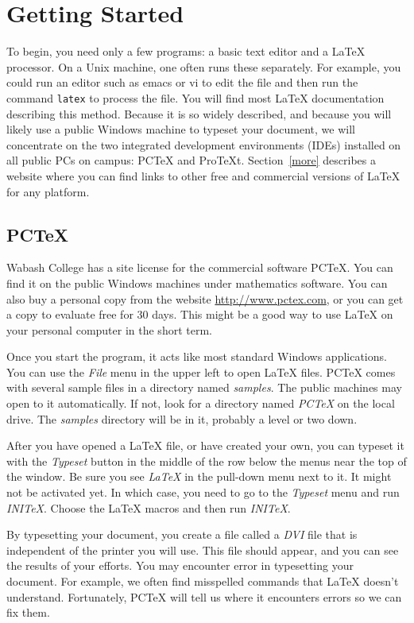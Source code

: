 \documentclass[titlepage]{article}                %
\theoremstyle{definition}
\theoremstyle{remark}
\begin{document}
\section{Getting Started}
\label{start}

To begin, you need only a few programs: a basic text editor and a \LaTeX{}
processor.  On a Unix machine, one often runs these separately.  For example,
you could run an editor such as emacs or vi to edit the file and then run the
command \verb=latex= to process the file.  You will find most \LaTeX{}
documentation describing this method.  Because it is so widely described, and
because you will likely use a public Windows machine to typeset your document,
we will concentrate on the two integrated development environments (IDEs)
installed on all public PCs on campus: PCTeX and ProTeXt.  Section~\ref{more}
describes a website where you can find links to other free and commercial
versions of \LaTeX{} for any platform.

\subsection{PCTeX}

Wabash College has a site license for the commercial software PCTeX.  You can
find it on the public Windows machines under mathematics software.  You can
also buy a personal copy from the website \url{http://www.pctex.com}, or you
can get a copy to evaluate free for 30 days.  This might be a good way to use
\LaTeX{} on your personal computer in the short term.

Once you start the program, it acts like most standard Windows applications.
You can use the \emph{File} menu in the upper left to open \LaTeX{} files.
PCTeX comes with several sample files in a directory named \emph{samples}.
The public machines may open to it automatically.  If not, look for a
directory named \emph{PCTeX} on the local drive.  The \emph{samples} directory
will be in it, probably a level or two down.

After you have opened a \LaTeX{} file, or have created your own, you can
typeset it with the \emph{Typeset} button in the middle of the row below the
menus near the top of the window.  Be sure you see \emph{\LaTeX{}} in the
pull-down menu next to it.  It might not be activated yet.  In which case, you
need to go to the \emph{Typeset} menu and run \emph{INITeX}.  Choose the
\LaTeX{} macros and then run \emph{INITeX}.  

By typesetting your document, you create a file called a \emph{DVI} file that
is independent of the printer you will use.  This file should appear, and you
can see the results of your efforts.  You may encounter error in typesetting
your document.  For example, we often find misspelled commands that \LaTeX{}
doesn't understand.  Fortunately, PCTeX will tell us where it encounters
errors so we can fix them.
\end{document}
